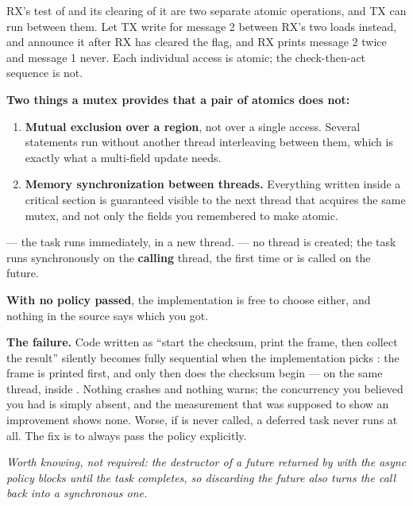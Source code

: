 \noindent RX's test of  and its clearing of it are two separate atomic operations, and
TX can run between them. Let TX write  for message 2 between RX's two loads instead, and
announce it after RX has cleared the flag, and RX prints message 2 twice and message 1 never. Each
individual access is atomic; the check-then-act sequence is not.

\textbf{Two things a mutex provides that a pair of atomics does not:} 
\begin{enumerate}
  \item \textbf{Mutual exclusion over a region}, not over a single access. Several statements run
    without another thread interleaving between them, which is exactly what a multi-field update
    needs.
  \item \textbf{Memory synchronization between threads.} Everything written inside a critical
    section is guaranteed visible to the next thread that acquires the same mutex, and not only the
    fields you remembered to make atomic.
\end{enumerate}

\textbf{} --- the task runs immediately, in a new thread.
\textbf{} --- no thread is created; the task runs synchronously on the
\textbf{calling} thread, the first time  or  is called on the future.

\textbf{With no policy passed}, the implementation is free to choose either, and nothing in the
source says which you got. 

\textbf{The failure.} Code written as ``start the checksum, print the frame, then collect the
result'' silently becomes fully sequential when the implementation picks : the frame
is printed first, and only then does the checksum begin --- on the same thread, inside
. Nothing crashes and nothing warns; the concurrency you believed you had is simply
absent, and the measurement that was supposed to show an improvement shows none. Worse, if
 is never called, a deferred task never runs at all. The fix is to always pass the
policy explicitly. 

{\itshape Worth knowing, not required: the destructor of a future returned by 
with the async policy blocks until the task completes, so discarding the future also turns the call
back into a synchronous one.\par}

